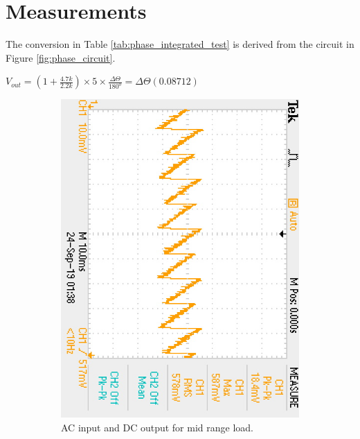 \section{Measurements} \label{sec:measurements_phase}
The conversion in Table \ref{tab:phase_integrated_test} is derived from the circuit in Figure \ref{fig:phase_circuit}.

$V_{out} = (1 + \frac{4.7k}{2.2k}) \times 5 \times \frac{\Delta\Theta}{180^o} = \Delta\Theta(0.08712)$
\begin{figure}
 \centering
     \begin{subfigure}[]{0.45\textwidth}
        \centering
         \includegraphics[height=1\linewidth,angle =90]{./Figures/phase_measure}
		    \caption{AC input and DC output for mid range load.} \label{subfig:phase_measure}
     \end{subfigure}
      \begin{subfigure}[]{0.45\textwidth}
              \centering

\end{subfigure}
\end{figure}
